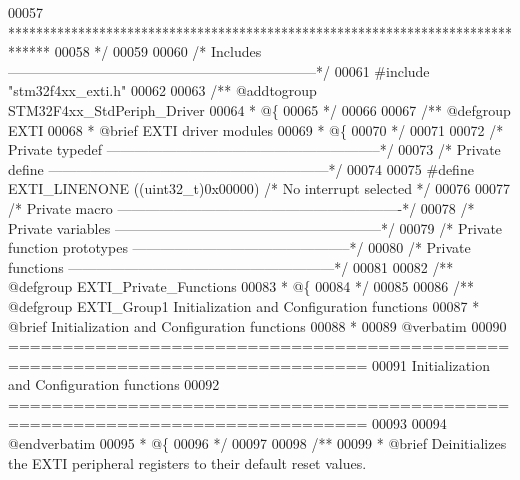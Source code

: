 \begin{DoxyCode}
00057 \textcolor{comment}{  ******************************************************************************}
00058 \textcolor{comment}{  */}
00059 
00060 \textcolor{comment}{/* Includes ------------------------------------------------------------------*/}
00061 \textcolor{preprocessor}{#}\textcolor{preprocessor}{include} "stm32f4xx_exti.h"
00062 
00063 \textcolor{comment}{/** @addtogroup STM32F4xx\_StdPeriph\_Driver}
00064 \textcolor{comment}{  * @\{}
00065 \textcolor{comment}{  */}
00066 
00067 \textcolor{comment}{/** @defgroup EXTI }
00068 \textcolor{comment}{  * @brief EXTI driver modules}
00069 \textcolor{comment}{  * @\{}
00070 \textcolor{comment}{  */}
00071 
00072 \textcolor{comment}{/* Private typedef -----------------------------------------------------------*/}
00073 \textcolor{comment}{/* Private define ------------------------------------------------------------*/}
00074 
00075 \textcolor{preprocessor}{#}\textcolor{preprocessor}{define} \textcolor{preprocessor}{EXTI\_LINENONE}    \textcolor{preprocessor}{(}\textcolor{preprocessor}{(}\textcolor{preprocessor}{uint32\_t}\textcolor{preprocessor}{)}0x00000\textcolor{preprocessor}{)}  \textcolor{comment}{/* No interrupt selected */}
00076 
00077 \textcolor{comment}{/* Private macro -------------------------------------------------------------*/}
00078 \textcolor{comment}{/* Private variables ---------------------------------------------------------*/}
00079 \textcolor{comment}{/* Private function prototypes -----------------------------------------------*/}
00080 \textcolor{comment}{/* Private functions ---------------------------------------------------------*/}
00081 
00082 \textcolor{comment}{/** @defgroup EXTI\_Private\_Functions}
00083 \textcolor{comment}{  * @\{}
00084 \textcolor{comment}{  */}
00085 
00086 \textcolor{comment}{/** @defgroup EXTI\_Group1 Initialization and Configuration functions}
00087 \textcolor{comment}{ *  @brief   Initialization and Configuration functions }
00088 \textcolor{comment}{ *}
00089 \textcolor{comment}{@verbatim   }
00090 \textcolor{comment}{ ===============================================================================}
00091 \textcolor{comment}{                  Initialization and Configuration functions}
00092 \textcolor{comment}{ ===============================================================================  }
00093 \textcolor{comment}{}
00094 \textcolor{comment}{@endverbatim}
00095 \textcolor{comment}{  * @\{}
00096 \textcolor{comment}{  */}
00097 
00098 \textcolor{comment}{/**}
00099 \textcolor{comment}{  * @brief  Deinitializes the EXTI peripheral registers to their default reset values.}

\end{DoxyCode}
